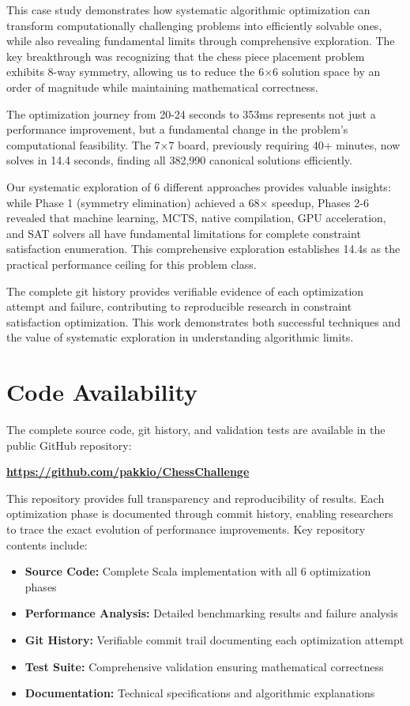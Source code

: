 \documentclass[12pt,a4paper]{article}
\theoremstyle{definition}
\begin{document}
This case study demonstrates how systematic algorithmic optimization can transform computationally challenging problems into efficiently solvable ones, while also revealing fundamental limits through comprehensive exploration. The key breakthrough was recognizing that the chess piece placement problem exhibits 8-way symmetry, allowing us to reduce the 6$\times$6 solution space by an order of magnitude while maintaining mathematical correctness.

The optimization journey from 20-24 seconds to 353ms represents not just a performance improvement, but a fundamental change in the problem's computational feasibility. The 7$\times$7 board, previously requiring 40+ minutes, now solves in 14.4 seconds, finding all 382,990 canonical solutions efficiently.

Our systematic exploration of 6 different approaches provides valuable insights: while Phase 1 (symmetry elimination) achieved a 68× speedup, Phases 2-6 revealed that machine learning, MCTS, native compilation, GPU acceleration, and SAT solvers all have fundamental limitations for complete constraint satisfaction enumeration. This comprehensive exploration establishes 14.4s as the practical performance ceiling for this problem class.

The complete git history provides verifiable evidence of each optimization attempt and failure, contributing to reproducible research in constraint satisfaction optimization. This work demonstrates both successful techniques and the value of systematic exploration in understanding algorithmic limits.

\section{Code Availability}

The complete source code, git history, and validation tests are available in the public GitHub repository:

\begin{center}
\textbf{\url{https://github.com/pakkio/ChessChallenge}}
\end{center}

This repository provides full transparency and reproducibility of results. Each optimization phase is documented through commit history, enabling researchers to trace the exact evolution of performance improvements. Key repository contents include:

\begin{itemize}
\item \textbf{Source Code:} Complete Scala implementation with all 6 optimization phases
\item \textbf{Performance Analysis:} Detailed benchmarking results and failure analysis
\item \textbf{Git History:} Verifiable commit trail documenting each optimization attempt
\item \textbf{Test Suite:} Comprehensive validation ensuring mathematical correctness
\item \textbf{Documentation:} Technical specifications and algorithmic explanations
\end{itemize}
\end{document}
